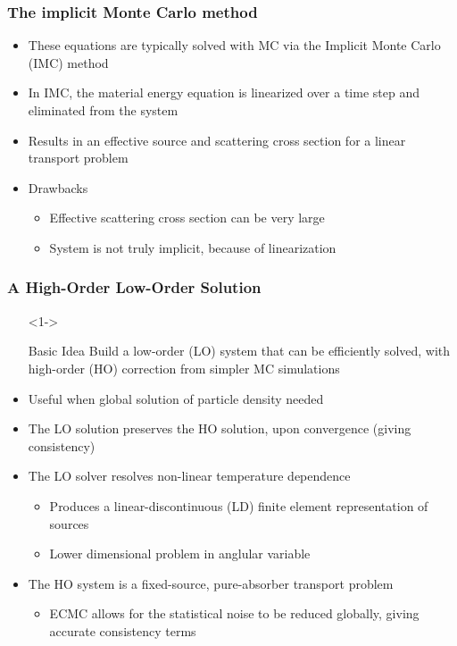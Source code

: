 \documentclass[xcolor=dvipsnames,handout,unknownkeysallowed]{beamer}
\newcommand{\colb}[1]{{\color{blue} #1}}
\newlength{\wideitemsep}
\let\olditem\item
\renewcommand{\item}{\setlength{\itemsep}{\wideitemsep}\olditem}
\begin{document}
\begin{frame}
\frametitle{The implicit Monte Carlo method}
\begin{itemize}
\item These equations are typically solved with MC via the Implicit Monte Carlo (IMC) method
\item In IMC, the material energy equation is linearized over a time step and eliminated from the system
\item Results in an effective source and scattering cross section for a linear transport problem
\item Drawbacks 
\begin{itemize}
\item Effective scattering cross section can be very large
\item System is not truly implicit, because of linearization
\end{itemize}
\end{itemize}
\end{frame}

\begin{frame}
    \frametitle{A High-Order Low-Order Solution}
        \begin{itemize}
            \item[]<1-> \begin{block}{Basic Idea} Build a low-order (LO) system that can be efficiently solved,
                with high-order (HO) correction from simpler MC simulations \end{block}
                \vspace{-0.321in}
              \item Useful when global solution of particle density needed
              \item<1-> The LO solution
                  preserves the HO solution, upon 
                  convergence (giving consistency)
              \item<2-> The LO solver resolves non-linear temperature dependence
                \begin{itemize}
                    \item<2-> Produces a linear-discontinuous (LD) finite element  representation of sources
                    \item<2-> \colb{Lower dimensional} problem in anglular variable
                \end{itemize}
            \item<3-> The HO system is a fixed-source, pure-absorber transport problem
                \begin{itemize}
                    \item<3-> ECMC allows for the statistical noise to be reduced
                        globally, giving accurate consistency terms
                \end{itemize}
        \end{itemize}
\end{frame}
\end{document}
